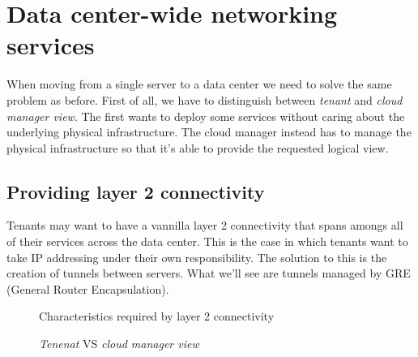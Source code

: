 \section{Data center-wide networking services}
When moving from a single server to a data center we need to solve the same
problem as before. First of all, we have to distinguish between \emph{tenant}
and \emph{cloud manager view}. The first wants to deploy some services without
caring about the underlying physical infrastructure. The cloud manager instead
has to manage the physical infrastructure so that it's able to provide the
requested logical view.

\subsection{Providing layer 2 connectivity}
Tenants may want to have a vannilla layer 2 connectivity that spans amongs all of
their services across the data center. This is the case in which tenants want to
take IP addressing under their own responsibility. The solution to this
is the creation of tunnels between servers. What we'll see are tunnels
managed by GRE (General Router Encapsulation).

\newpage
\begin{figure}[ht!]
    \centering
    \caption{Characteristics required by layer 2 connectivity}
\end{figure}

\begin{figure}[h!]
    \centering
    \hspace{1.5cm}
    \caption{\emph{Tenenat} VS \emph{cloud manager view}}
\end{figure}

